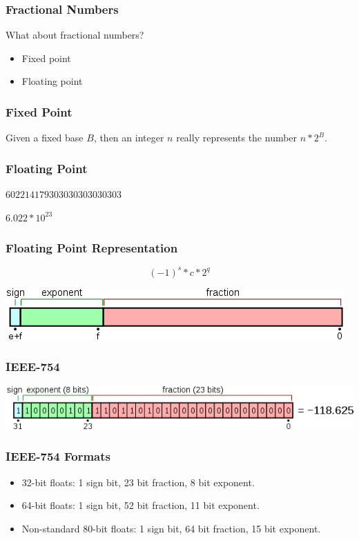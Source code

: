 \begin{frame}[fragile]
\frametitle{Fractional Numbers}

What about fractional numbers?

\begin{itemize}
\item Fixed point
\item Floating point
\end{itemize}

\end{frame}

\begin{frame}[fragile]
\frametitle{Fixed Point}

Given a fixed base $B$, then an integer $n$ really represents the number $n * 2^B$.


\end{frame}

\begin{frame}[fragile]
\frametitle{Floating Point}

$602214179303030303030303$

\pause
$6.022 * 10^{23}$
\end{frame}

\begin{frame}[fragile]
\frametitle{Floating Point Representation}

\[
(-1)^s * c * 2^q
\]

\centering
\includegraphics[width=.6\textwidth]{images/FP-format.png}

\end{frame}

\begin{frame}[fragile]
\frametitle{IEEE-754}

\centering
\includegraphics[width=.8\textwidth]{images/FP-example.png}

\end{frame}

\begin{frame}[fragile]
\frametitle{IEEE-754 Formats}

\begin{itemize}
\item 32-bit floats: 1 sign bit, 23 bit fraction, 8 bit exponent.
\item 64-bit floats: 1 sign bit, 52 bit fraction, 11 bit exponent.
\item \alert{Non-standard} 80-bit floats: 1 sign bit, 64 bit fraction, 15 bit exponent.
\end{itemize}
\end{frame}

